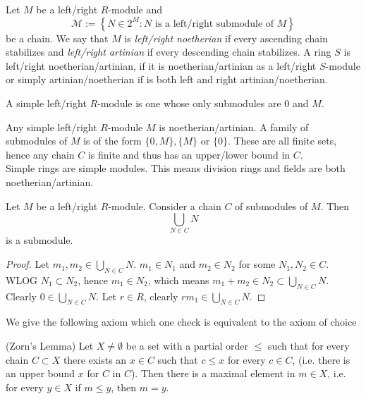 \begin{definition}\label{NoetherianArtinianDef}
    Let $M$ be a left/right $R$-module and 
    $$\mathcal{M} := \left\{ N\in 2^M : N \text{ is a left/right submodule of } M \right\}$$
    be a chain. We say that $M$ is \textit{left/right noetherian} if every ascending chain stabilizes and \textit{left/right artinian} if every descending chain stabilizes. A ring $S$ is left/right noetherian/artinian, if it is noetherian/artinian as a left/right $S$-module or simply artinian/noetherian if is both left and right artinian/noetherian.  
\end{definition}
\begin{definition}
    A simple left/right $R$-module is one whose only submodules are $0$ and $M$.
\end{definition}
\begin{example}
    Any simple left/right $R$-module $M$ is noetherian/artinian. A family of submodules of $M$ is of the form $\{0,M\},\{M\}$ or $\{0\}$. These are all finite sets, hence any chain $C$ is finite and thus has an upper/lower bound in $C$.\\
    Simple rings are simple modules. This means division rings and fields are both noetherian/artinian.
\end{example}
\begin{lemma}\label{UnionOverChainOfSubmodulesIsSubmodule}
    Let $M$ be a left/right $R$-module. Consider a chain $C$ of submodules of $M$. Then 
    $$\bigcup_{N\in C} N$$
    is a submodule.
\end{lemma}
\begin{proof}
    Let $m_1,m_2\in \bigcup_{N\in C} N$. $m_1\in N_1$ and $m_2\in N_2$ for some $N_1,N_2\in C$. WLOG $N_1\subset N_2$, hence $m_1\in N_2$, which means $m_1+m_2\in N_2 \subset \bigcup_{N\in C} N$. Clearly $0\in \bigcup_{N\in C} N$. Let $r\in R$, clearly $rm_1\in \bigcup_{N\in C} N$.
\end{proof}
We give the following axiom which one check is equivalent to the axiom of choice 
\begin{axioms}\label{ZornsLemma}(Zorn's Lemma)
    Let $X\neq \emptyset$ be a set with a partial order $\leq$ such that for every chain $C\subset X$ there exists an $x\in C$ such that $c\leq x$ for every $c\in C$, (i.e. there is an upper bound $x$ for $C$ in $C$). Then there is a maximal element in $m \in X$, i.e. for every $y \in X$ if $m\leq y$, then $m=y$.
\end{axioms}
